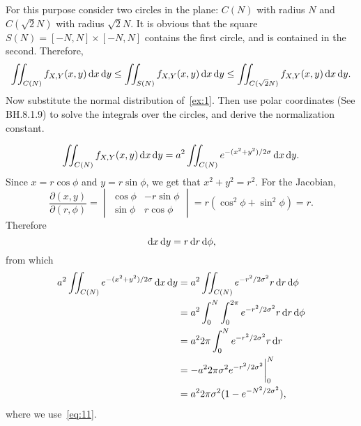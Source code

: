 \begin{exercise}
For this purpose consider two circles in the plane: $C(N)$ with radius $N$ and $C(\sqrt 2 N)$ with radius $\sqrt 2 N$.
It is obvious that the square $S(N) = [-N,N]\times[-N,N]$ contains the first circle, and is contained in the second.
Therefore,
\begin{equation}
  \label{eq:13}
  \iint_{C(N)}f_{X,Y}(x,y) \,\textrm{d}x\,\textrm{d}y \leq
  \iint_{S(N)}f_{X,Y}(x,y) \,\textrm{d}x\,\textrm{d}y \leq
  \iint_{C(\sqrt 2 N)}f_{X,Y}(x,y) \,\textrm{d}x\,\textrm{d}y.
\end{equation}
Now substitute the normal distribution of~\cref{ex:1}.
Then use polar coordinates (See BH.8.1.9) to solve the integrals over the circles, and derive the normalization constant.
\begin{solution}
\begin{equation}
\label{eq:14}
  \iint_{C(N)}f_{X,Y}(x,y) \,\textrm{d}x\,\textrm{d}y =
a^{2}  \iint_{C(N)} e^{-(x^{2}+y^{2})/2\sigma} \,\textrm{d}x\,\textrm{d}y.
\end{equation}
Since  $x = r \cos \phi$ and $y=r\sin \phi$, we get that $x^2+y^2 = r^{2}$. For the Jacobian,
\begin{equation}
  \label{eq:15}
  \frac{\partial(x, y)}{\partial(r,\phi)} =
  \begin{vmatrix}
    \cos \phi  & -r\sin \phi \\
    \sin \phi  & r\cos \phi
  \end{vmatrix}
= r(\cos^{2} \phi + \sin^2 \phi) = r.
\end{equation}
Therefore
\begin{equation}
\label{eq:16}
\,\textrm{d}x \,\textrm{d}y = r \,\textrm{d}r \,\textrm{d}\phi,
\end{equation}
from which
\begin{align}
a^{2}  \iint_{C(N)} e^{-(x^{2}+y^{2})/2\sigma} \,\textrm{d}x\,\textrm{d}y
&=a^{2}  \iint_{C(N)} e^{-r^{2}/2\sigma^{2}} r \,\textrm{d}r\,\textrm{d}\phi \\
&= a^{2}  \int_{0}^{N} \int_{0}^{2\pi} e^{-r^{2}/2\sigma^{2}} r \,\textrm{d}r\,\textrm{d}\phi \\
&= a^{2}  2\pi \int_{0}^{N}  e^{-r^{2}/2\sigma^{2}} r \,\textrm{d}r \\
&= - a^{2}  2\pi{\sigma^{2}} e^{-r^{2}/2\sigma^{2}}\biggr|_{0}^{N} \\
&= a^{2}2\pi{\sigma^{2}} (1-e^{-N^{2}/2\sigma^{2}}),
\end{align}
where we use~\cref{eq:11}.



\end{solution}
\end{exercise}
